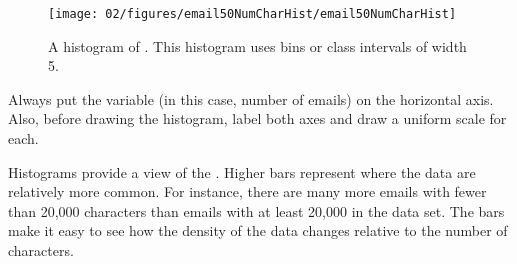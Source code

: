 \begin{figure}[bth]
   \centering
   \texttt{[image: 02/figures/email50NumCharHist/email50NumCharHist]}
   \caption{A histogram of .  This histogram uses bins or class intervals of width 5. }
   \label{email50NumCharHist}
\end{figure}




\begin{tipBox}{
Always put the variable (in this case, number of emails) on the horizontal axis.  Also, before drawing the histogram, label both axes and draw a uniform scale for each.}
\end{tipBox}

Histograms provide a view of the . Higher bars represent where the data are relatively more common. For instance, there are many more emails with fewer than 20,000 characters than emails with at least 20,000 in the data set. The bars make it easy to see how the density of the data changes relative to the number of characters.

